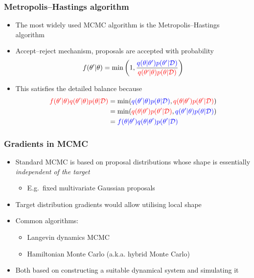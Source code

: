 \documentclass{beamer}
\newcommand{\dataset}{\mathcal{D}}
\newcommand{\parameters}{\theta}
\begin{document}
\begin{frame}
  \frametitle{Metropolis--Hastings algorithm}

  \begin{itemize}
  \item The most widely used MCMC algorithm is the Metropolis--Hastings
    algorithm
  \item Accept--reject mechanism, proposals are accepted with probability
    $$ f(\parameters' | \parameters) = \min\left(1, \frac{\color{blue}q(\parameters | \parameters') p(\parameters' | \dataset)}
      {\color{red}q(\parameters' | \parameters) p(\parameters | \dataset)} \right) $$
  \item This satisfies the detailed balance because
    \begin{align*}
      {\color{red}f(\parameters' | \parameters)
      q(\parameters' | \parameters) p(\parameters | \dataset)}
      &= \min({\color{blue}q(\parameters' | \parameters) p(\parameters | \dataset)},
      {\color{red}q(\parameters | \parameters') p(\parameters' | \dataset)}) \\
      &= \min({\color{red}q(\parameters | \parameters') p(\parameters' | \dataset)},
      {\color{blue}q(\parameters' | \parameters) p(\parameters | \dataset)}) \\
      &= {\color{blue}f(\parameters | \parameters')
      q(\parameters | \parameters') p(\parameters' | \dataset)}
    \end{align*}
  \end{itemize}
\end{frame}

\begin{frame}
  \frametitle{Gradients in MCMC}

  \begin{itemize}
  \item Standard MCMC is based on proposal distributions whose shape is
    essentially \emph{independent of the target}
    \begin{itemize}
    \item E.g.~fixed multivariate Gaussian proposals
    \end{itemize}
  \item Target distribution gradients would allow utilising local shape
  \item Common algorithms:
    \begin{itemize}
    \item Langevin dynamics MCMC
    \item Hamiltonian Monte Carlo  (a.k.a. hybrid Monte Carlo)
    \end{itemize}
  \item Both based on constructing a suitable dynamical system and
    simulating it
  \end{itemize}
\end{frame}
\end{document}

